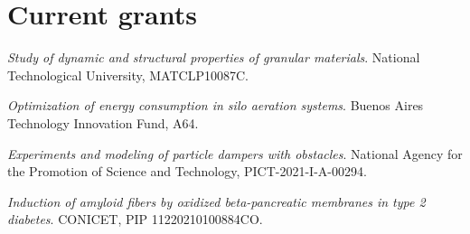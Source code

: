 \section{Current grants}
\begin{timeline}
 \textit{Study of dynamic and structural properties of granular materials}. National Technological University, MATCLP10087C.

 \textit{Optimization of energy consumption in silo aeration systems}. Buenos Aires Technology Innovation Fund, A64.

 \textit{Experiments and modeling of particle dampers with obstacles}. National Agency for the Promotion of Science and Technology, PICT-2021-I-A-00294.

 \textit{Induction of amyloid fibers by oxidized beta-pancreatic membranes in type 2 diabetes}. CONICET, PIP 11220210100884CO.
\end{timeline}